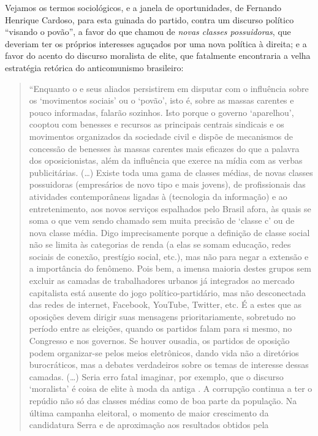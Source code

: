 Vejamos os termos sociológicos, e a janela de oportunidades, de Fernando
Henrique Cardoso, para esta guinada do partido, contra um discurso
político ``visando o povão'', a favor do que chamou de \emph{novas
classes possuidoras}, que deveriam ter os próprios interesses aguçados
por uma nova política à direita; e a favor do acento do discurso
moralista de elite, que fatalmente encontraria a velha estratégia
retórica do anticomunismo brasileiro:

\begin{quote}
``Enquanto o  e seus aliados persistirem em disputar com o 
influência sobre os `movimentos sociais' ou o `povão', isto é, sobre as
massas carentes e pouco informadas, falarão sozinhos. Isto porque o
governo `aparelhou', cooptou com benesses e recursos as principais
centrais sindicais e os movimentos organizados da sociedade civil e
dispõe de mecanismos de concessão de benesses às massas carentes mais
eficazes do que a palavra dos oposicionistas, além da influência que
exerce na mídia com as verbas publicitárias. (…) Existe toda uma gama
de classes médias, de novas classes possuidoras (empresários de novo
tipo e mais jovens), de profissionais das atividades contemporâneas
ligadas à  (tecnologia da informação) e ao entretenimento, aos novos
serviços espalhados pelo Brasil afora, às quais se soma o que vem sendo
chamado sem muita precisão de `classe c' ou de nova classe média. Digo
imprecisamente porque a definição de classe social não se limita às
categorias de renda (a elas se somam educação, redes sociais de conexão,
prestígio social, etc.), mas não para negar a extensão e a importância
do fenômeno. Pois bem, a imensa maioria destes grupos sem excluir as
camadas de trabalhadores urbanos já integrados ao mercado capitalista
está ausente do jogo político-partidário, mas não desconectada das redes
de internet, Facebook, YouTube, Twitter, etc. É a estes que as oposições
devem dirigir suas mensagens prioritariamente, sobretudo no período
entre as eleições, quando os partidos falam para si mesmo, no Congresso
e nos governos. Se houver ousadia, os partidos de oposição podem
organizar-se pelos meios eletrônicos, dando vida não a diretórios
burocráticos, mas a debates verdadeiros sobre os temas de interesse
dessas camadas. (…) Seria erro fatal imaginar, por exemplo, que o
discurso `moralista' é coisa de elite à moda da antiga . A corrupção
continua a ter o repúdio não só das classes médias como de boa parte da
população. Na última campanha eleitoral, o momento de maior crescimento
da candidatura Serra e de aproximação aos resultados obtidos pela

\end{quote}
